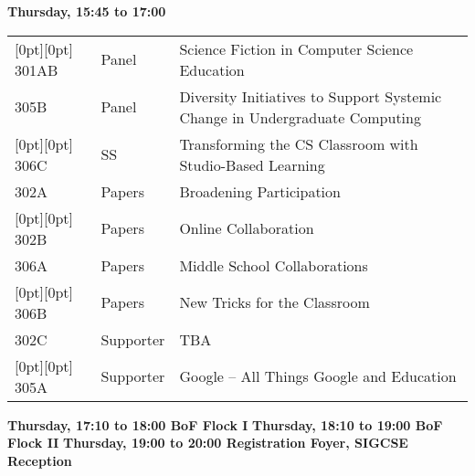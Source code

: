\noindent
{\sffamily\bfseries Thursday, 15:45 to 17:00}\newline\noindent
\begin{tabular*}{5in}{@{}p{0.5in}@{}p{0.75in}@{}p{3.75in}}

\rowcolor[gray]{0.9}[0pt][0pt] 301AB & Panel & Science Fiction in Computer Science Education \\

305B & Panel & Diversity Initiatives to Support Systemic Change in Undergraduate Computing \\

\rowcolor[gray]{0.9}[0pt][0pt] 306C & SS & Transforming the CS Classroom with Studio-Based Learning \\

302A & Papers & Broadening Participation \\

\rowcolor[gray]{0.9}[0pt][0pt] 302B & Papers & Online Collaboration \\

306A & Papers & Middle School Collaborations \\

\rowcolor[gray]{0.9}[0pt][0pt] 306B & Papers & New Tricks for the Classroom \\

302C & Supporter & TBA \\

\rowcolor[gray]{0.9}[0pt][0pt] 305A & Supporter & Google -- All Things Google and Education 
\end{tabular*} \newline

\noindent
{\sffamily\bfseries Thursday, 17:10 to 18:00  BoF Flock I}\newline\noindent 
{\sffamily\bfseries Thursday, 18:10 to 19:00 BoF Flock II}\newline\noindent
{\sffamily\bfseries Thursday, 19:00 to 20:00 Registration Foyer, SIGCSE Reception}\newline\noindent



